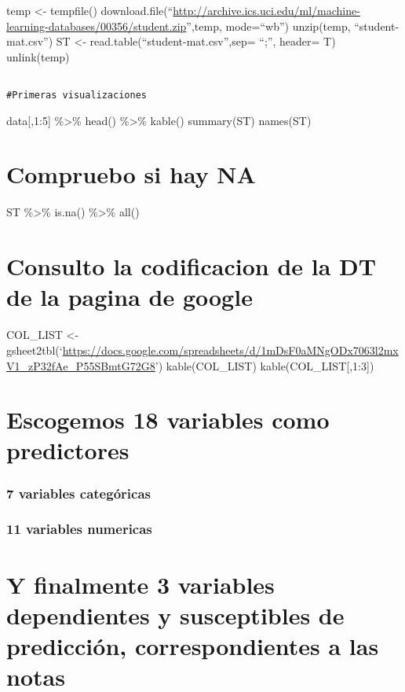 \documentclass[]{article}
\begin{document}
temp \textless{}- tempfile()
download.file(``\url{http://archive.ics.uci.edu/ml/machine-learning-databases/00356/student.zip}'',temp,
mode=``wb'') unzip(temp, ``student-mat.csv'') ST \textless{}-
read.table(``student-mat.csv'',sep= ``;'', header= T) unlink(temp)

\begin{verbatim}

#Primeras visualizaciones
\end{verbatim}

data{[},1:5{]} \%\textgreater{}\% head() \%\textgreater{}\% kable()
summary(ST) names(ST)

\section{Compruebo si hay NA}\label{compruebo-si-hay-na}

ST \%\textgreater{}\% is.na() \%\textgreater{}\% all()

\section{Consulto la codificacion de la DT de la pagina de
google}\label{consulto-la-codificacion-de-la-dt-de-la-pagina-de-google}

COL\_LIST \textless{}-
gsheet2tbl(`\url{https://docs.google.com/spreadsheets/d/1mDsF0aMNgODx7063l2mxV1_zP32fAe_P55SBmtG72G8}')
kable(COL\_LIST) kable(COL\_LIST{[},1:3{]})

\section{Escogemos 18 variables como
predictores}\label{escogemos-18-variables-como-predictores}

\subsubsection{7 variables categóricas}\label{variables-categoricas}

\subsubsection{11 variables numericas}\label{variables-numericas}

\section{Y finalmente 3 variables dependientes y susceptibles de
predicción, correspondientes a las
notas}\label{y-finalmente-3-variables-dependientes-y-susceptibles-de-prediccion-correspondientes-a-las-notas}
\end{document}
